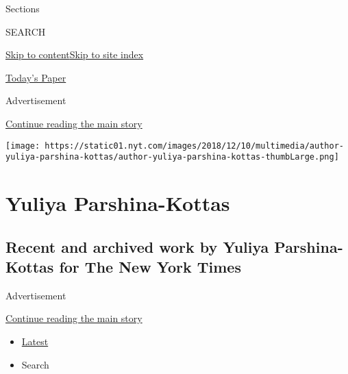 Sections

SEARCH

\protect\hyperlink{site-content}{Skip to
content}\protect\hyperlink{site-index}{Skip to site index}

\href{https://myaccount.nytimes.com/auth/login?response_type=cookie\&client_id=vi}{}

\href{https://www.nytimes.com/section/todayspaper}{Today's Paper}

Advertisement

\protect\hyperlink{after-top}{Continue reading the main story}

\texttt{[image: https://static01.nyt.com/images/2018/12/10/multimedia/author-yuliya-parshina-kottas/author-yuliya-parshina-kottas-thumbLarge.png]}

\hypertarget{yuliya-parshina-kottas}{%
\section{Yuliya Parshina-Kottas}\label{yuliya-parshina-kottas}}

\hypertarget{recent-and-archived-work-by-yuliya-parshina-kottas-for-the-new-york-times}{%
\subsection{Recent and archived work by Yuliya Parshina-Kottas for The
New York
Times}\label{recent-and-archived-work-by-yuliya-parshina-kottas-for-the-new-york-times}}

Advertisement

\protect\hyperlink{after-mid1}{Continue reading the main story}

\begin{itemize}
\tightlist
\item
  \protect\hyperlink{stream-panel}{Latest}
\item
  Search
\end{itemize}

